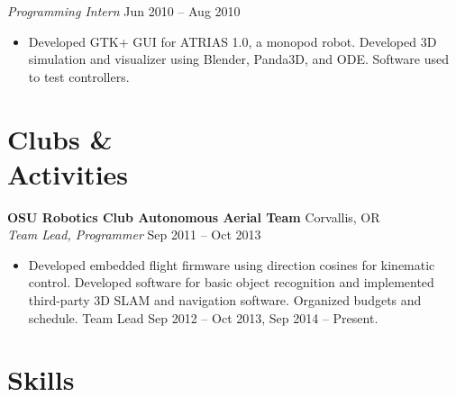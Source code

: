 \documentclass[10pt,letterpaper,margin]{res}
\begin{document}
\begin{resume}
{\it Programming Intern} \hfill {\color{lightgray} Jun 2010 -- Aug 2010}\vspace{0.0em}

\begin{itemize}
	\item Developed GTK+ GUI for ATRIAS 1.0, a monopod robot. Developed 3D
		simulation and visualizer using Blender, Panda3D, and ODE. Software
		used to test controllers.
\end{itemize}



\section{Clubs \& \\ Activities}

{\bf OSU Robotics Club Autonomous Aerial Team} \hfill {\color{lightgray} Corvallis, OR} \\
{\it Team Lead, Programmer} \hfill {\color{lightgray} Sep 2011 -- Oct 2013}\vspace{0.0em}

\begin{itemize}
	\item Developed embedded flight firmware using direction cosines for
		kinematic control. Developed software for basic object recognition and
		implemented third-party 3D SLAM and navigation software.  Organized
		budgets and schedule. Team Lead Sep 2012 -- Oct 2013, Sep 2014 --
		Present.
\end{itemize}



%
%


\section{Skills}


\end{resume}
\end{document}
